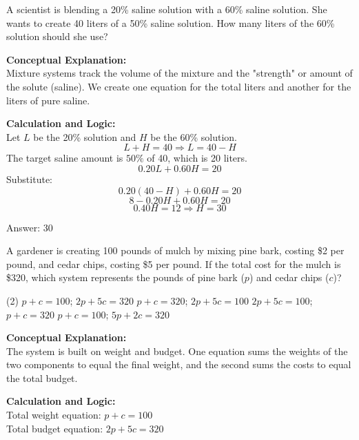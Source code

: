 \documentclass[11pt,paper=a4,answers]{exam}
\begin{document}
\begin{questions}
\question
A scientist is blending a 20\% saline solution with a 60\% saline solution. She wants to create 40 liters of a 50\% saline solution. How many liters of the 60\% solution should she use?

\begin{solution}
\textbf{Conceptual Explanation:} \\
Mixture systems track the volume of the mixture and the "strength" or amount of the solute (saline). We create one equation for the total liters and another for the liters of pure saline.

\vspace{10pt}
\textbf{Calculation and Logic:} \\
Let $L$ be the 20\% solution and $H$ be the 60\% solution.
\[L + H = 40 \Rightarrow L = 40 - H\]
The target saline amount is $50\%$ of 40, which is 20 liters.
\[0.20L + 0.60H = 20\]
Substitute:
\[0.20(40 - H) + 0.60H = 20\]
\[8 - 0.20H + 0.60H = 20\]
\[0.40H = 12 \Rightarrow H = 30\]

\vspace{15pt}
Answer: \colorbox{yellow!100}{30}
\end{solution}

\question
A gardener is creating 100 pounds of mulch by mixing pine bark, costing \$2 per pound, and cedar chips, costing \$5 per pound. If the total cost for the mulch is \$320, which system represents the pounds of pine bark ($p$) and cedar chips ($c$)?
\begin{tasks}(2)
    \task $p + c = 100$; $2p + 5c = 320$
    \task $p + c = 320$; $2p + 5c = 100$
    \task $2p + 5c = 100$; $p + c = 320$
    \task $p + c = 100$; $5p + 2c = 320$
\end{tasks}

\begin{solution}
\textbf{Conceptual Explanation:} \\
The system is built on weight and budget. One equation sums the weights of the two components to equal the final weight, and the second sums the costs to equal the total budget.

\vspace{10pt}
\textbf{Calculation and Logic:} \\
Total weight equation: $p + c = 100$ \\
Total budget equation: $2p + 5c = 320$


\end{solution}
\end{questions}
\end{document}
